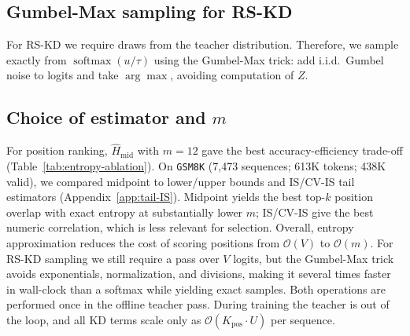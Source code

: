 \documentclass[11pt]{article}
\begin{document}
\subsection{Gumbel-Max sampling for RS-KD}
For RS-KD we require draws from the teacher distribution.
Therefore, we sample exactly from $\operatorname{softmax}(u/\tau)$ using the Gumbel-Max trick: add i.i.d.\ Gumbel noise to logits and take $\arg\max$, avoiding computation of $Z$.

\subsection{Choice of estimator and $m$}
For position ranking, $\widehat{H}_{\text{mid}}$ with $m{=}12$ gave the best accuracy-efficiency trade-off (Table~\ref{tab:entropy-ablation}).
On \texttt{GSM8K} (7{,}473 sequences; 613K tokens; 438K valid), we compared midpoint to lower/upper bounds and IS/CV-IS tail estimators (Appendix~\ref{app:tail-IS}).
Midpoint yields the best top-$k$ position overlap with exact entropy at substantially lower $m$; IS/CV-IS give the best numeric correlation, which is less relevant for selection.
Overall, entropy approximation reduces the cost of scoring positions from $\mathcal{O}(V)$ to $\mathcal{O}(m)$.
For RS-KD sampling we still require a pass over $V$ logits, but the Gumbel-Max trick avoids exponentials, normalization, and divisions, making it several times faster in wall-clock than a softmax while yielding exact samples.
Both operations are performed once in the offline teacher pass.
During training the teacher is out of the loop, and all KD terms scale only as $\mathcal{O}(K_{\text{pos}}\!\cdot\!U)$ per sequence.
\end{document}
